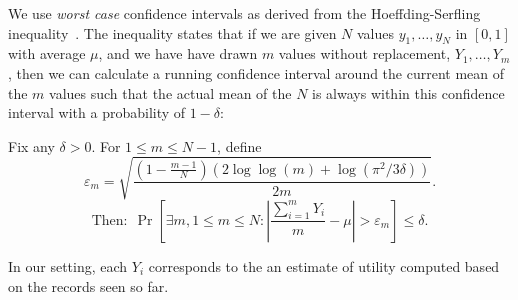 We use {\it worst case} confidence intervals as derived from
the Hoeffding-Serfling inequality~\cite{serfling1974probability}.
The inequality states that if we are given $N$ values $y_1, \ldots, y_N$ in 
$[0, 1]$ with average $\mu$, and we have have drawn $m$ values without replacement, $Y_1, \ldots, Y_m$, 
then we can calculate a running confidence interval around the current mean 
of the $m$ values such that the actual mean of the $N$
is always within this confidence interval with a probability of $1 - \delta$:
\begin{theorem}
\label{thm:hs}
Fix any $\delta > 0$. For $1 \le m \le N-1$, define
{\small $$
\varepsilon_m = \sqrt{\frac{(1-\frac{m-1}N)(2\log \log (m) + \log(\pi^2/3\delta))}{2m}}.
$$
$$
\textrm{Then:} \ \   \Pr\left[ \exists m, 1 \le m \le N : 
  \left|\frac{\sum_{i=1}^m Y_i}{m} - \mu\right| > \varepsilon_m \right] 
\le \delta.
$$
}
\end{theorem}
\vspace{-5pt}
In our setting, each $Y_i$ corresponds to the an estimate of utility computed based on the
records seen so far. 




